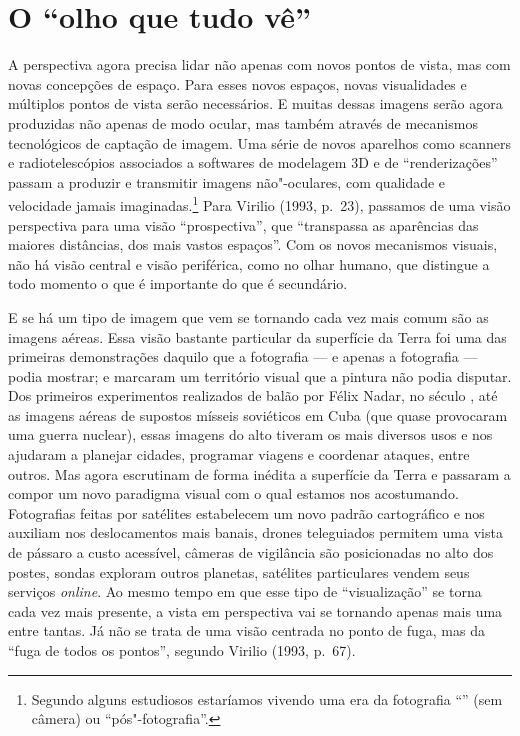 \chapter{O ``olho que tudo vê''}

A perspectiva agora precisa lidar não apenas com novos pontos de vista,
mas com novas concepções de espaço. Para esses novos espaços, novas
visualidades e múltiplos pontos de vista serão necessários. E muitas
dessas imagens serão agora produzidas não apenas de modo ocular, mas
também através de mecanismos tecnológicos de captação de imagem. Uma
série de novos aparelhos como scanners e radiotelescópios associados a
softwares de modelagem 3D e de ``renderizações'' passam a produzir e
transmitir imagens não"-oculares, com qualidade e velocidade jamais
imaginadas.\footnote{Segundo alguns estudiosos estaríamos vivendo uma
  era da fotografia ``{}'' (sem câmera) ou
  ``pós"-fotografia''.} Para Virilio (1993, p.~23), passamos de uma visão
perspectiva para uma visão ``prospectiva'', que ``transpassa as
aparências das maiores distâncias, dos mais vastos espaços''. Com os
novos mecanismos visuais, não há visão central e visão periférica, como
no olhar humano, que distingue a todo momento o que é importante do que
é secundário.

E se há um tipo de imagem que vem se tornando cada vez mais comum são as
imagens aéreas. Essa visão bastante particular da superfície da Terra
foi uma das primeiras demonstrações daquilo que a fotografia --- e apenas
a fotografia --- podia mostrar; e marcaram um território visual que a
pintura não podia disputar. Dos primeiros experimentos realizados de
balão por Félix Nadar, no século , até as imagens aéreas de supostos
mísseis soviéticos em Cuba (que quase provocaram uma guerra nuclear),
essas imagens do alto tiveram os mais diversos usos e nos ajudaram a
planejar cidades, programar viagens e coordenar ataques, entre outros.
Mas agora escrutinam de forma inédita a superfície da Terra e passaram a
compor um novo paradigma visual com o qual estamos nos acostumando.
Fotografias feitas por satélites estabelecem um novo padrão cartográfico
e nos auxiliam nos deslocamentos mais banais, drones teleguiados
permitem uma vista de pássaro a custo acessível, câmeras de vigilância
são posicionadas no alto dos postes, sondas exploram outros planetas,
satélites particulares vendem seus serviços \emph{online}. Ao mesmo
tempo em que esse tipo de ``visualização'' se torna cada vez mais
presente, a vista em perspectiva vai se tornando apenas mais uma entre
tantas. Já não se trata de uma visão centrada no ponto de fuga, mas da
``fuga de todos os pontos'', segundo Virilio (1993, p.~67).


